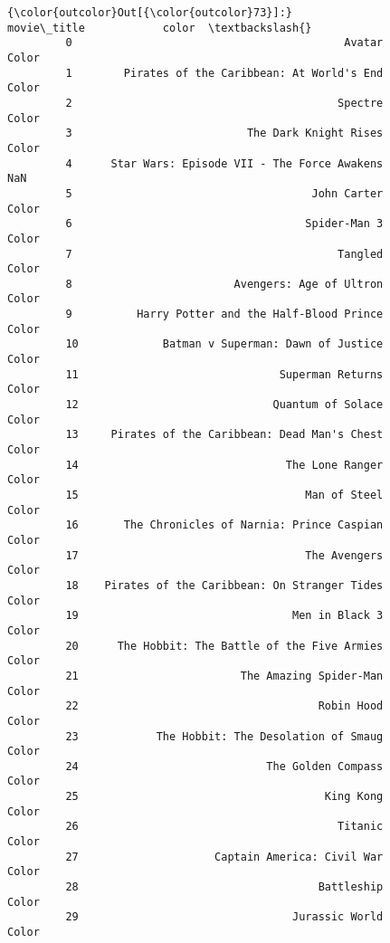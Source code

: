 \documentclass[11pt]{article}
\begin{document}
\begin{Verbatim}[commandchars=\\\{\}]
{\color{outcolor}Out[{\color{outcolor}73}]:}                                       movie\_title            color  \textbackslash{}
         0                                          Avatar            Color   
         1        Pirates of the Caribbean: At World's End            Color   
         2                                         Spectre            Color   
         3                           The Dark Knight Rises            Color   
         4      Star Wars: Episode VII - The Force Awakens              NaN   
         5                                     John Carter            Color   
         6                                    Spider-Man 3            Color   
         7                                         Tangled            Color   
         8                         Avengers: Age of Ultron            Color   
         9          Harry Potter and the Half-Blood Prince            Color   
         10             Batman v Superman: Dawn of Justice            Color   
         11                               Superman Returns            Color   
         12                              Quantum of Solace            Color   
         13     Pirates of the Caribbean: Dead Man's Chest            Color   
         14                                The Lone Ranger            Color   
         15                                   Man of Steel            Color   
         16       The Chronicles of Narnia: Prince Caspian            Color   
         17                                   The Avengers            Color   
         18    Pirates of the Caribbean: On Stranger Tides            Color   
         19                                 Men in Black 3            Color   
         20      The Hobbit: The Battle of the Five Armies            Color   
         21                         The Amazing Spider-Man            Color   
         22                                     Robin Hood            Color   
         23            The Hobbit: The Desolation of Smaug            Color   
         24                             The Golden Compass            Color   
         25                                      King Kong            Color   
         26                                        Titanic            Color   
         27                     Captain America: Civil War            Color   
         28                                     Battleship            Color   
         29                                 Jurassic World            Color   

\end{Verbatim}
\end{document}
